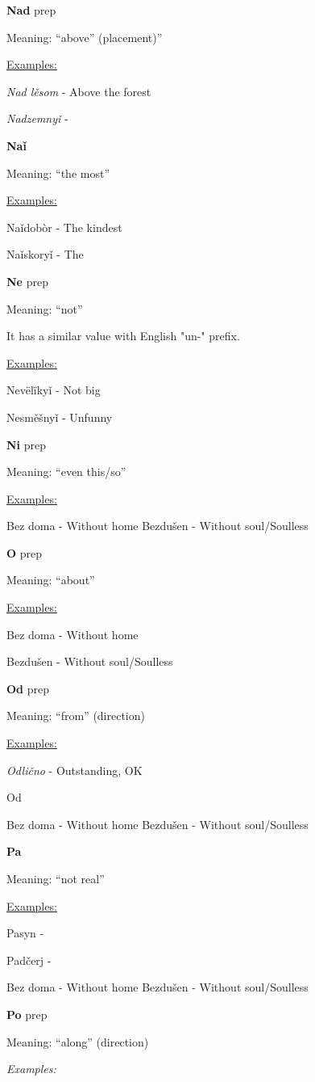 \textbf{Nad} \gls{prep}

Meaning: “above” (placement)”

\underline{Examples:}

\textit{Nad lěsom} - Above the forest

\textit{Nadzemnyǐ} - 

\textbf{Naǐ}

Meaning: “the most”

\underline{Examples:}

Naǐdobòr - The kindest

Naǐskoryǐ - The 

\textbf{Ne} \gls{prep}

Meaning: “not”

It has a similar value with English "un-" prefix.

\underline{Examples:}

Nevëlïkyǐ - Not big

Nesměšnyǐ - Unfunny

\textbf{Ni} \gls{prep}

Meaning: “even this/so”

\underline{Examples:}


Bez doma - Without home
Bezdušen - Without soul/Soulless 

\textbf{O}  \gls{prep}

Meaning: “about”

\underline{Examples:}

Bez doma - Without home

Bezdušen - Without soul/Soulless 

\textbf{Od} \gls{prep}

Meaning: “from” (direction)

\underline{Examples:}

\textit{Odlično} - Outstanding, OK

Od

Bez doma - Without home
Bezdušen - Without soul/Soulless 

\textbf{Pa}

Meaning: “not real”

\underline{Examples:}

Pasyn - 

Padčerj - 

Bez doma - Without home
Bezdušen - Without soul/Soulless 

\textbf{Po} \gls{prep}

Meaning: “along” (direction)

\textit{Examples:}



